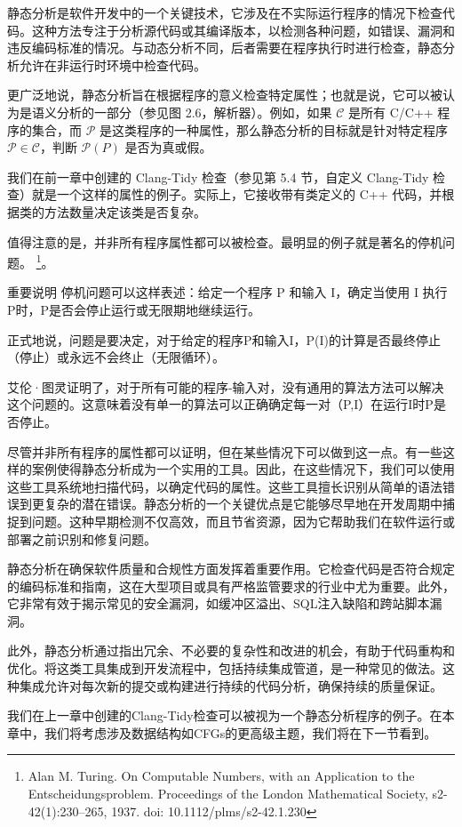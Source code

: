 静态分析是软件开发中的一个关键技术，它涉及在不实际运行程序的情况下检查代码。这种方法专注于分析源代码或其编译版本，以检测各种问题，如错误、漏洞和违反编码标准的情况。与动态分析不同，后者需要在程序执行时进行检查，静态分析允许在非运行时环境中检查代码。

更广泛地说，静态分析旨在根据程序的意义检查特定属性；也就是说，它可以被认为是语义分析的一部分（参见图 2.6，解析器）。例如，如果 $\mathcal{C}$ 是所有 C/C++ 程序的集合，而 $\mathcal{P}$ 是这类程序的一种属性，那么静态分析的目标就是针对特定程序 $\mathcal{P} \in \mathcal{C}$，判断 $\mathcal{P}(P)$ 是否为真或假。

我们在前一章中创建的 Clang-Tidy 检查（参见第 5.4 节，自定义 Clang-Tidy 检查）就是一个这样的属性的例子。实际上，它接收带有类定义的 C++ 代码，并根据类的方法数量决定该类是否复杂。

值得注意的是，并非所有程序属性都可以被检查。最明显的例子就是著名的停机问题。 \footnote{Alan M. Turing. On Computable Numbers, with an Application to the Entscheidungsproblem. Proceedings of the London Mathematical Society, s2-42(1):230–265, 1937. doi: 10.1112/plms/s2-42.1.230}。

\begin{myNotic}{重要说明}
停机问题可以这样表述：给定一个程序 P 和输入 I，确定当使用 I 执行 P时，P是否会停止运行或无限期地继续运行。
\end{myNotic}

正式地说，问题是要决定，对于给定的程序P和输入I，P(I)的计算是否最终停止（停止）或永远不会终止（无限循环）。

艾伦·图灵证明了，对于所有可能的程序-输入对，没有通用的算法方法可以解决这个问题的。这意味着没有单一的算法可以正确确定每一对（P,I）在运行I时P是否停止。

尽管并非所有程序的属性都可以证明，但在某些情况下可以做到这一点。有一些这样的案例使得静态分析成为一个实用的工具。因此，在这些情况下，我们可以使用这些工具系统地扫描代码，以确定代码的属性。这些工具擅长识别从简单的语法错误到更复杂的潜在错误。静态分析的一个关键优点是它能够尽早地在开发周期中捕捉到问题。这种早期检测不仅高效，而且节省资源，因为它帮助我们在软件运行或部署之前识别和修复问题。

静态分析在确保软件质量和合规性方面发挥着重要作用。它检查代码是否符合规定的编码标准和指南，这在大型项目或具有严格监管要求的行业中尤为重要。此外，它非常有效于揭示常见的安全漏洞，如缓冲区溢出、SQL注入缺陷和跨站脚本漏洞。

此外，静态分析通过指出冗余、不必要的复杂性和改进的机会，有助于代码重构和优化。将这类工具集成到开发流程中，包括持续集成管道，是一种常见的做法。这种集成允许对每次新的提交或构建进行持续的代码分析，确保持续的质量保证。

我们在上一章中创建的Clang-Tidy检查可以被视为一个静态分析程序的例子。在本章中，我们将考虑涉及数据结构如CFGs的更高级主题，我们将在下一节看到。
